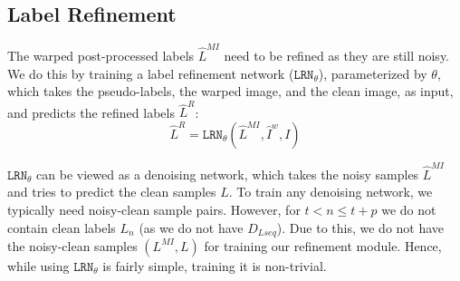 \let\clearpage\relax



\subsection{Label Refinement}
\label{subsec-lr}

The warped post-processed labels $\hat{L}^{MI}$ need to be refined as they are still noisy. We do this by training a label refinement network ($\texttt{LRN}_\theta$), parameterized by $\theta$, which takes the pseudo-labels, the warped image, and the clean image, as input, and predicts the refined labels $\hat{L}^{R}$:
\begin{equation}
\label{eq-lrn_inference}
\hat{L}^{R} = \texttt{LRN}_{\theta}(\hat{L}^{MI}, \hat{I}^{w}, I)
\end{equation}

$\texttt{LRN}_\theta$ can be viewed as a denoising network, which takes the noisy samples $\hat{L}^{MI}$ and tries to predict the clean samples $L$. To train any denoising network, we typically need noisy-clean sample pairs. However, for ${t < n \leq t + p}$ we do not contain clean labels $L_{n}$ (as we do not have $D_{Lseq}$). Due to this, we do not have the noisy-clean samples $(L^{MI}, L)$ for training our refinement module. Hence, while using $\mathtt{LRN}_\theta$ is fairly simple, training it is non-trivial.


